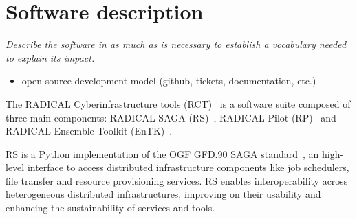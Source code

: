\documentclass[preprint,12pt, a4paper]{elsarticle}
\begin{document}


\section{Software description}\label{sec:description}

{\em Describe the software in as much as is necessary to establish a
vocabulary needed to explain its impact.}

\begin{itemize}
  \item open source development model (github, tickets, documentation,
  etc.)
\end{itemize}

The RADICAL Cyberinfrastructure tools (RCT)~\cite{web-rct} is a software
suite composed of three main components: RADICAL-SAGA
(RS)~\cite{merzky2015saga}, RADICAL-Pilot (RP)~\cite{merzky2018using} and
RADICAL-Ensemble Toolkit (EnTK)~\cite{balasubramanian2018harnessing}.

RS is a Python implementation of the OGF GFD.90 SAGA
standard~\cite{goodale2006saga}, an high-level interface to access
distributed infrastructure components like job schedulers, file transfer and
resource provisioning services. RS enables interoperability across
heterogeneous distributed infrastructures, improving on their usability and
enhancing the sustainability of services and tools.
\end{document}
